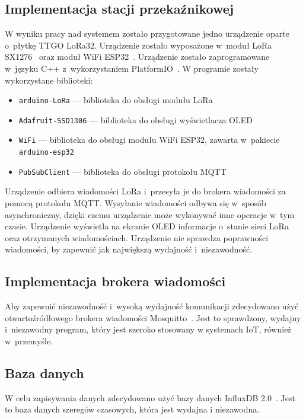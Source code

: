 \subsection{Implementacja stacji przekaźnikowej}
W wyniku pracy nad systemem zostało przygotowane jedno urządzenie oparte o~płytkę TTGO LoRa32.
Urządzenie zostało wyposażone w~moduł LoRa SX1276~\cite{ESP32:sx1276-doc} oraz moduł WiFi ESP32~\cite{ESP32:datasheet}.
Urządzenie zostało zaprogramowane w~języku C++ z~wykorzystaniem PlatformIO~\cite{tool:pio}.
W programie zostały wykorzystane biblioteki:
\begin{itemize}
    \item \texttt{arduino-LoRa} — biblioteka do obsługi modułu LoRa~\cite{ESP32:lora-lib}
    \item \texttt{Adafruit-SSD1306} — biblioteka do obsługi wyświetlacza OLED~\cite{ESP32:Adafruit-SSD1306}
    \item \texttt{WiFi} — biblioteka do obsługi modułu WiFi ESP32, zawarta w~pakiecie \texttt{arduino-esp32}~\cite{ESP32:Arduino}
    \item \texttt{PubSubClient} — biblioteka do obsługi protokołu MQTT~\cite{ESP32:PubSubClient}
\end{itemize}
Urządzenie odbiera wiadomości LoRa i~przesyła je do brokera wiadomości za pomocą protokołu MQTT.
Wysyłanie wiadomości odbywa się w~sposób asynchroniczny, dzięki czemu urządzenie może wykonywać inne operacje w~tym czasie.
Urządzenie wyświetla na ekranie OLED informacje o~stanie sieci LoRa oraz otrzymanych wiadomościach.
Urządzenie nie sprawdza poprawności wiadomości, by zapewnić jak największą wydajność i~niezawodność.

\subsection{Implementacja brokera wiadomości}
Aby zapewnić niezawodność i~wysoką wydajność komunikacji zdecydowano użyć otwartoźródłowego brokera wiadomości Mosquitto~\cite{tool:mosquitto}.
Jest to sprawdzony, wydajny i~niezawodny program, który jest szeroko stosowany w systemach IoT, również w~przemyśle.~\cite{tool:mosquitto}

\subsection{Baza danych}
W celu zapisywania danych zdecydowano użyć bazy danych InfluxDB 2.0~\cite{tool:influxdb}. Jest to baza danych szeregów czasowych, która jest wydajna i niezawodna.~\cite{tool:influxdb}


